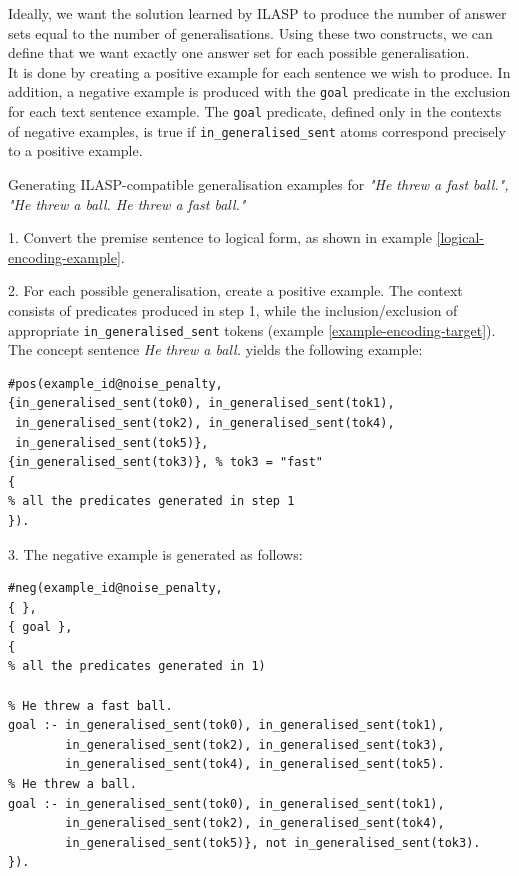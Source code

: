 Ideally, we want the solution learned by ILASP to produce the number of answer sets equal to the number of generalisations.
Using these two constructs, we can define that we want exactly one answer set for each possible generalisation. \\
It is done by creating a positive example for each sentence we wish to produce. 
In addition, a negative example is produced with the \verb_goal_ predicate in the exclusion for each text sentence example.
The \verb_goal_ predicate, defined only in the contexts of negative examples, is true if \verb+in_generalised_sent+ atoms correspond precisely to a positive example.


\begin{example}
Generating ILASP-compatible generalisation examples for \textit{"He threw a fast ball.", "He threw a ball. He threw a fast ball."}

1. Convert the premise sentence to logical form, as shown in example \ref{logical-encoding-example}.

2. For each possible generalisation, create a positive example. The context consists of predicates produced in step 1, while the inclusion/exclusion of appropriate \verb+in_generalised_sent+ tokens (example \ref{example-encoding-target}). The concept sentence \textit{He threw a ball.} yields the following example:
\begin{verbatim}
#pos(example_id@noise_penalty,
{in_generalised_sent(tok0), in_generalised_sent(tok1), 
 in_generalised_sent(tok2), in_generalised_sent(tok4), 
 in_generalised_sent(tok5)},
{in_generalised_sent(tok3)}, % tok3 = "fast"
{
% all the predicates generated in step 1
}).
\end{verbatim}

3. The negative example is generated as follows:
\begin{verbatim}
#neg(example_id@noise_penalty,
{ },
{ goal },
{
% all the predicates generated in 1)

% He threw a fast ball.
goal :- in_generalised_sent(tok0), in_generalised_sent(tok1), 
        in_generalised_sent(tok2), in_generalised_sent(tok3), 
        in_generalised_sent(tok4), in_generalised_sent(tok5).
% He threw a ball.
goal :- in_generalised_sent(tok0), in_generalised_sent(tok1), 
        in_generalised_sent(tok2), in_generalised_sent(tok4), 
        in_generalised_sent(tok5)}, not in_generalised_sent(tok3).
}).
\end{verbatim}
\end{example}

